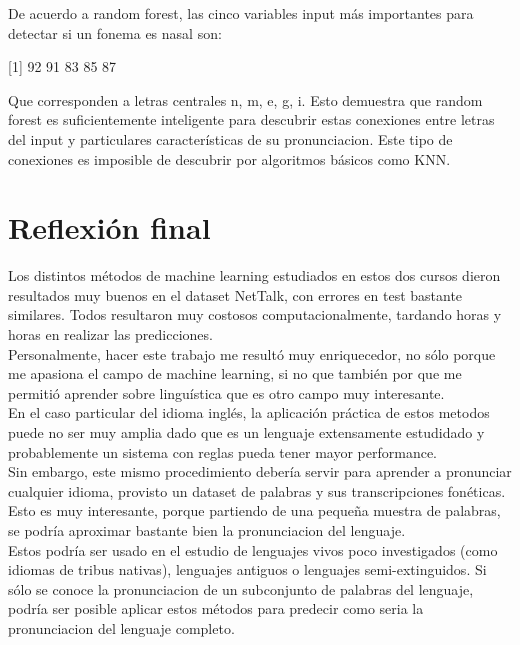 \documentclass[paper=a4, fontsize=11pt]{scrartcl} %
\numberwithin{equation}{section} %
\numberwithin{figure}{section} %
\numberwithin{table}{section} %
\begin{document}
De acuerdo a random forest, las cinco variables input más importantes para detectar si un fonema es nasal son:

\begin{center}
[1]  92  91  83  85  87
\end{center}

Que corresponden a letras centrales n, m, e, g, i. Esto  demuestra que random forest es suficientemente inteligente para descubrir estas conexiones entre letras del input y particulares características de su pronunciacion. Este tipo de conexiones es imposible de descubrir por algoritmos básicos como KNN.

\section{ Reflexión final }

Los distintos métodos de machine learning estudiados en estos dos cursos dieron resultados muy buenos en el dataset NetTalk, con errores en test bastante similares. Todos resultaron muy costosos computacionalmente, tardando horas y horas en realizar las predicciones. \\

Personalmente, hacer este trabajo me resultó muy enriquecedor, no sólo porque me apasiona el campo de machine learning, si no que también por que me permitió aprender sobre linguística que es otro campo muy interesante. \\

En el caso particular del idioma inglés, la aplicación práctica de estos metodos puede no ser muy amplia dado que es un lenguaje extensamente estudidado y probablemente un sistema con reglas pueda tener mayor performance. \\

Sin embargo, este mismo procedimiento debería servir para aprender a pronunciar cualquier idioma, provisto un dataset de palabras y sus transcripciones fonéticas. Esto es muy interesante, porque partiendo de una pequeña muestra de palabras, se podría aproximar bastante bien la pronunciacion del lenguaje. \\

Estos podría ser usado en el estudio de lenguajes vivos poco investigados (como idiomas de tribus nativas), lenguajes antiguos o lenguajes semi-extinguidos. Si sólo se conoce la pronunciacion de un subconjunto de palabras del lenguaje, podría ser posible aplicar estos métodos para predecir como seria la pronunciacion del lenguaje completo. \\
\end{document}

